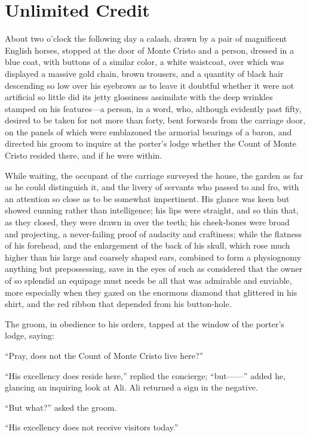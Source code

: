 \chapter{Unlimited Credit}

About two o’clock the following day a calash, drawn by a pair of
magnificent English horses, stopped at the door of Monte Cristo and a
person, dressed in a blue coat, with buttons of a similar color, a
white waistcoat, over which was displayed a massive gold chain, brown
trousers, and a quantity of black hair descending so low over his
eyebrows as to leave it doubtful whether it were not artificial so
little did its jetty glossiness assimilate with the deep wrinkles
stamped on his features—a person, in a word, who, although evidently
past fifty, desired to be taken for not more than forty, bent forwards
from the carriage door, on the panels of which were emblazoned the
armorial bearings of a baron, and directed his groom to inquire at the
porter’s lodge whether the Count of Monte Cristo resided there, and if
he were within.

While waiting, the occupant of the carriage surveyed the house, the
garden as far as he could distinguish it, and the livery of servants
who passed to and fro, with an attention so close as to be somewhat
impertinent. His glance was keen but showed cunning rather than
intelligence; his lips were straight, and so thin that, as they closed,
they were drawn in over the teeth; his cheek-bones were broad and
projecting, a never-failing proof of audacity and craftiness; while the
flatness of his forehead, and the enlargement of the back of his skull,
which rose much higher than his large and coarsely shaped ears,
combined to form a physiognomy anything but prepossessing, save in the
eyes of such as considered that the owner of so splendid an equipage
must needs be all that was admirable and enviable, more especially when
they gazed on the enormous diamond that glittered in his shirt, and the
red ribbon that depended from his button-hole.

The groom, in obedience to his orders, tapped at the window of the
porter’s lodge, saying:

“Pray, does not the Count of Monte Cristo live here?”

“His excellency does reside here,” replied the concierge; “but——” added
he, glancing an inquiring look at Ali. Ali returned a sign in the
negative.

“But what?” asked the groom.

“His excellency does not receive visitors today.”


